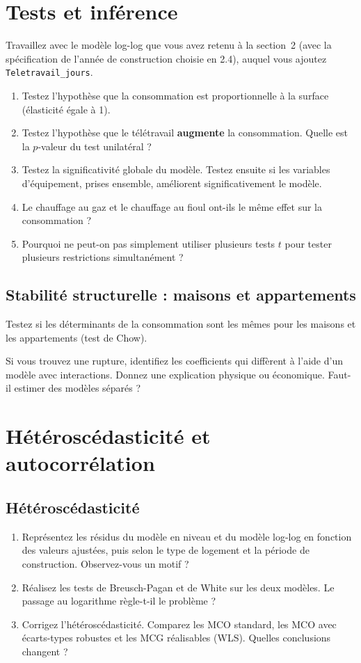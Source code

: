 \documentclass[11pt,a4paper]{article}
\newcommand{\var}[1]{\texttt{#1}}
\begin{document}
\section{Tests et inférence}
Travaillez avec le modèle log-log que vous avez retenu à la section~2 (avec la spécification de l'année de construction choisie en 2.4), auquel vous ajoutez \var{Teletravail\_jours}.
\begin{enumerate}
  \item Testez l'hypothèse que la consommation est proportionnelle à la surface (élasticité égale à 1).
  \item Testez l'hypothèse que le télétravail \textbf{augmente} la consommation. Quelle est la $p$-valeur du test unilatéral ?
  \item Testez la significativité globale du modèle. Testez ensuite si les variables d'équipement, prises ensemble, améliorent significativement le modèle.
  \item Le chauffage au gaz et le chauffage au fioul ont-ils le même effet sur la consommation ?
  \item Pourquoi ne peut-on pas simplement utiliser plusieurs tests $t$ pour tester plusieurs restrictions simultanément ?
\end{enumerate}

\subsection{Stabilité structurelle : maisons et appartements}
Testez si les déterminants de la consommation sont les mêmes pour les maisons et les appartements (test de Chow).

\begin{afaire}
Si vous trouvez une rupture, identifiez les coefficients qui diffèrent à l'aide d'un modèle avec interactions. Donnez une explication physique ou économique. Faut-il estimer des modèles séparés ?
\end{afaire}

\section{Hétéroscédasticité et autocorrélation}

\subsection{Hétéroscédasticité}
\begin{enumerate}
  \item Représentez les résidus du modèle en niveau et du modèle log-log en fonction des valeurs ajustées, puis selon le type de logement et la période de construction. Observez-vous un motif ?
  \item Réalisez les tests de Breusch-Pagan et de White sur les deux modèles. Le passage au logarithme règle-t-il le problème ?
  \item Corrigez l'hétéroscédasticité. Comparez les MCO standard, les MCO avec écarts-types robustes et les MCG réalisables (WLS). Quelles conclusions changent ?
\end{enumerate}
\end{document}
